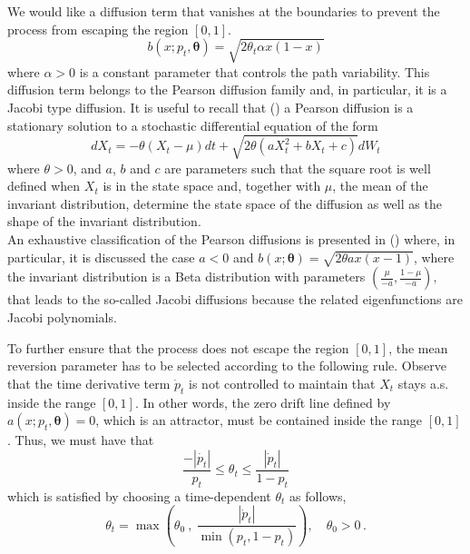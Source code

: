 \documentclass[11pt]{article}
\theoremstyle{definition}
\begin{document}
We would like  a diffusion term that vanishes at the boundaries to prevent the process from escaping the region $[0,1]$.
  \begin{equation}
    b (x; p_t,\bm{\theta} )= \sqrt{2 \theta_t \alpha x (1-x)}
  \end{equation}
  where $\alpha >0$ is a constant parameter that controls the path variability. This diffusion term belongs to the Pearson diffusion family and, in particular, it is a Jacobi type diffusion. It is useful to recall that (\cite[440]{foso}) a Pearson diffusion is a stationary solution to a stochastic differential equation of the form
 \begin{equation}
    dX_t = - \theta (X_t - \mu) dt + \sqrt{2 \theta (a X_t^2 + b X_t + c)} dW_t
  \end{equation}
where $\theta>0$, and $a$, $b$ and $c$ are parameters such that the square root is well defined when $X_t$ is in the state space and, together with $\mu$, the mean of the invariant distribution, determine the state space of the diffusion as well as the shape of the invariant distribution. \\ An exhaustive classification of the Pearson diffusions is presented in (\cite[440-443]{foso}) where, in particular, it is discussed the case $a < 0$ and $b(x; \bm{\theta}) = \sqrt{2 \theta a x (x-1)}$, where the invariant distribution is a Beta distribution with parameters $\left( \frac{\mu}{-a}, \frac{1 - \mu}{-a} \right),$ that leads to the so-called Jacobi diffusions because the related eigenfunctions are Jacobi polynomials.


To further ensure that the process does not escape the region $[0,1]$, the mean reversion parameter has to be selected according to the following rule. Observe that the time derivative term $\dot{p}_t $ is not controlled to maintain that $X_t$ stays a.s. inside the range $[0,1]$. In other words, the zero drift line defined by $a(x; p_t,\bm{\theta}) =0$, which is an attractor, must be contained inside the range $[0,1]$. Thus, we must have that
\begin{equation}
\frac{- |\dot{p_t}|}{p_t} \leq \theta_t \leq \frac{|\dot{p}_t|}{1- p_t}
\end{equation}
which is satisfied  by choosing a time-dependent  $\theta_t$ as follows,
\begin{equation}
\theta_t = \max \left( \theta_0 \ , \ \frac{|\dot{p}_t|}{\min (p_t, 1-p_t)}  \right ),  \quad \theta_0 >0\,. \label{theta_t}
\end{equation}
\end{document}
